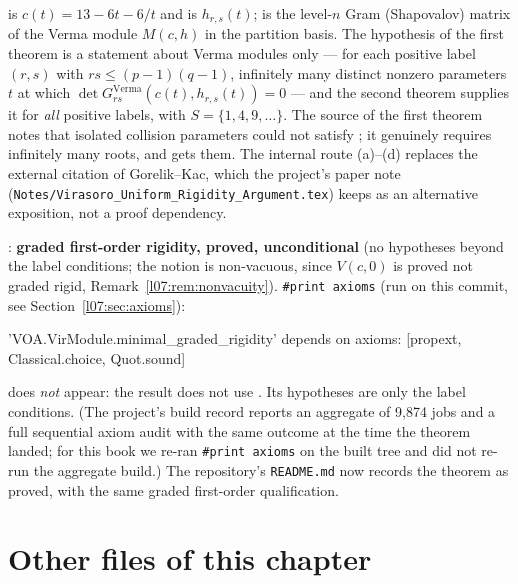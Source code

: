 \begin{dictionary}
 is $c(t) = 13-6t-6/t$ and  is $h_{r,s}(t)$;
 is the level-$n$ Gram (Shapovalov) matrix of the Verma module $M(c,h)$ in the
partition basis. The hypothesis  of the first theorem is a statement about Verma modules only ---
for each positive label $(r,s)$ with $rs\le(p-1)(q-1)$, infinitely many distinct nonzero parameters $t$ at which
$\det G^{\mathrm{Verma}}_{rs}(c(t),h_{r,s}(t)) = 0$ --- and the second theorem supplies it for \emph{all} positive
labels, with $S = \{1,4,9,\dots\}$. The source of the first theorem notes that isolated collision parameters could
not satisfy ; it genuinely requires infinitely many roots, and gets them. The internal route
(a)--(d) replaces the external citation of Gorelik--Kac, which the project's paper note
(\texttt{Notes/Virasoro\_Uniform\_Rigidity\_Argument.tex}) keeps as an alternative exposition, not a proof
dependency.
\end{dictionary}

\begin{status}
: \textbf{graded first-order rigidity, proved, unconditional}
(no hypotheses beyond the label conditions; the notion is non-vacuous, since $V(c,0)$ is proved not graded rigid,
Remark~\ref{l07:rem:nonvacuity}). \texttt{\#print axioms} (run on this
commit, see Section~\ref{l07:sec:axioms}):
\begin{plaincode}
'VOA.VirModule.minimal_graded_rigidity' depends on axioms: [propext, Classical.choice, Quot.sound]
\end{plaincode}
 does \emph{not} appear: the result does not use . Its hypotheses are only
the label conditions. (The project's build record reports an aggregate  of 9,874 jobs and
a full sequential axiom audit with the same outcome at the time the theorem landed; for this book we re-ran
\texttt{\#print axioms} on the built tree and did not re-run the aggregate build.) The repository's
\texttt{README.md} now records the theorem as proved, with the same graded first-order qualification.
\end{status}

\section{Other files of this chapter}\label{l07:sec:others}

